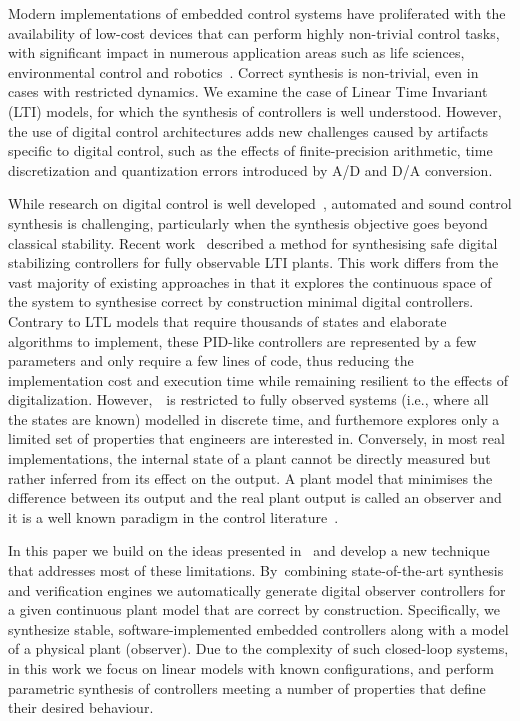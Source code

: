 \documentclass[sigconf]{llncs}
\begin{document}
Modern implementations of embedded control systems have proliferated with
the availability of low-cost devices that can perform highly non-trivial
control tasks, with significant impact in numerous application areas such as
life sciences, environmental control and robotics~\cite{astrom1997computer,Franklin15}.  Correct synthesis is non-trivial, even in cases with
restricted dynamics.  We examine the case of Linear Time Invariant (LTI)
models, for which the synthesis of controllers is well understood.  However,
the use of digital control architectures adds new challenges caused by
artifacts specific to digital control, such as the effects of
finite-precision arithmetic, time discretization and quantization errors
introduced by A/D and D/A conversion.

While research on digital control is well
developed~\cite{astrom1997computer}, automated and sound control synthesis
is challenging, particularly when the synthesis objective goes beyond
classical stability.  Recent work~\cite{abate2017automated} described a
method for synthesising safe digital stabilizing controllers for fully
observable LTI plants.  This work differs from the vast majority of existing
approaches in that it explores the continuous space of the system to
synthesise correct by construction minimal digital controllers.  Contrary to
LTL models  that require thousands of states and elaborate algorithms to
implement, these PID-like controllers are represented by a few parameters
and only require a few lines of code, thus reducing the implementation cost
and execution time while remaining resilient to the effects of digitalization.
However,~\cite{abate2017automated}~is restricted to fully observed
systems (i.e., where all the states are known) modelled in discrete time,
and furthemore explores only a limited set of properties that engineers
are interested in. Conversely, 
in most real implementations, the internal state of a plant cannot be
directly measured but rather inferred from its
effect on the output. A plant model that minimises the difference
between its output and the real plant output is called an observer and it is a well known
paradigm in the control literature~\cite{astrom1997computer}.


In this paper we build on the ideas presented in~\cite{abate2017automated}
and develop a new technique that addresses most of these limitations. 
By~combining state-of-the-art synthesis and verification engines we
automatically generate digital observer controllers for a given continuous
plant model that are correct by construction.  %
Specifically, we synthesize stable,
software-implemented embedded controllers along with a model of a physical
plant (observer).  Due to the complexity of such closed-loop systems, in
this work we focus on linear models with known configurations, and perform
parametric synthesis of controllers meeting a number of properties that
define their desired behaviour.
\end{document}
